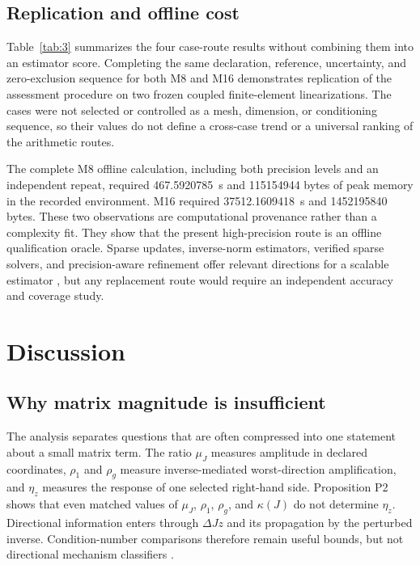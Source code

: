 \documentclass[preprint,12pt]{elsarticle}
\begin{document}
\subsection{Replication and offline cost}

Table~\ref{tab:3} summarizes the four case-route results without combining them into an estimator score. Completing the same declaration, reference, uncertainty, and zero-exclusion sequence for both M8 and M16 demonstrates replication of the assessment procedure on two frozen coupled finite-element linearizations. The cases were not selected or controlled as a mesh, dimension, or conditioning sequence, so their values do not define a cross-case trend or a universal ranking of the arithmetic routes.

\begin{table}[htbp]
\centering
\scriptsize
\caption{Route-specific response qualification for the two frozen finite-element tangents. Displayed values are rounded; Supplementary Table~S4 retains the exact decimal strings.}
\label{tab:3}

\end{table}

The complete M8 offline calculation, including both precision levels and an independent repeat, required 467.5920785~s and 115154944 bytes of peak memory in the recorded environment. M16 required 37512.1609418~s and 1452195840 bytes. These two observations are computational provenance rather than a complexity fit. They show that the present high-precision route is an offline qualification oracle. Sparse updates, inverse-norm estimators, verified sparse solvers, and precision-aware refinement offer relevant directions for a scalable estimator \cite{S26,S27,S28,S31}, but any replacement route would require an independent accuracy and coverage study.

\FloatBarrier
\section{Discussion}

\subsection{Why matrix magnitude is insufficient}

The analysis separates questions that are often compressed into one statement about a small matrix term. The ratio $\mu_J$ measures amplitude in declared coordinates, $\rho_1$ and $\rho_g$ measure inverse-mediated worst-direction amplification, and $\eta_z$ measures the response of one selected right-hand side. Proposition P2 shows that even matched values of $\mu_J$, $\rho_1$, $\rho_g$, and $\kappa(J)$ do not determine $\eta_z$. Directional information enters through $\Delta Jz$ and its propagation by the perturbed inverse. Condition-number comparisons therefore remain useful bounds, but not directional mechanism classifiers \cite{S01,S02,S03}.
\end{document}
